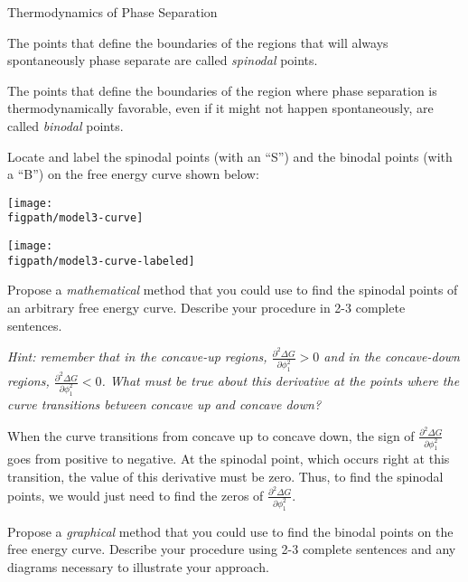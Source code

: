 \begin{activity}{Thermodynamics of Phase Separation}
\begin{ctqs}
\begin{solution}[2in]{}
				\end{solution}
				
\end{ctqs}

\clearpage
\begin{infobox}
	The points that define the boundaries of the regions that will always spontaneously phase separate are called \emph{spinodal} points.
	
	The points that define the boundaries of the region where phase separation is thermodynamically favorable, even if it might not happen spontaneously, are called \emph{binodal} points.
\end{infobox}

\begin{ctqs}
	\question Locate and label the spinodal points (with an ``S'') and the binodal points (with a ``B'') on the free energy curve shown below:
	
		\begin{solution}[2.5in]{		
				\centerline{\texttt{[image: \\figpath/model3-curve]}}
			}
				\centerline{\texttt{[image: \\figpath/model3-curve-labeled]}}
		\end{solution}
	
	\question Propose a \emph{mathematical} method that you could use to find the spinodal points of an arbitrary free energy curve.  Describe your procedure in 2-3 complete sentences.
	
		\emph{Hint: remember that in the concave-up regions, $\frac{\partial^2\Delta G}{\partial \phi_1^2} > 0$ and in the concave-down regions, $\frac{\partial^2\Delta G}{\partial \phi_1^2} < 0$.  What must be true about this derivative at the points where the curve transitions between concave up and concave down?}
		
		\begin{solution}[2.5in]{}
		
			When the curve transitions from concave up to concave down, the sign of $\frac{\partial^2\Delta G}{\partial \phi_1^2}$ goes from positive to negative.  At the spinodal point, which occurs right at this transition, the value of this derivative must be zero.  Thus, to find the spinodal points, we would just need to find the zeros of $\frac{\partial^2\Delta G}{\partial \phi_1^2}$.
		
		\end{solution}
		
	\question Propose a \emph{graphical} method that you could use to find the binodal points on the free energy curve.  Describe your procedure using 2-3 complete sentences and any diagrams necessary to illustrate your approach.
		\label{\labelbase:ctq:findbinodal}
		

\end{ctqs}
\end{activity}
